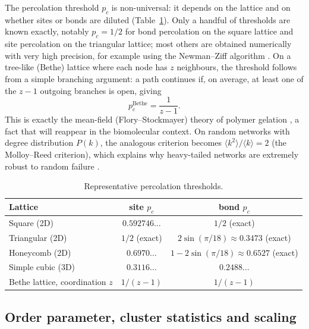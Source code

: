 \documentclass[11pt]{article}
\begin{document}
The percolation threshold $p_c$ is non-universal: it depends on the lattice and on whether sites or bonds are diluted (Table~\ref{tab:pc}). Only a handful of thresholds are known exactly, notably $p_c=1/2$ for bond percolation on the square lattice \cite{Kesten1980} and site percolation on the triangular lattice; most others are obtained numerically with very high precision, for example using the Newman--Ziff algorithm \cite{NewmanZiff2000}. On a tree-like (Bethe) lattice where each node has $z$ neighbours, the threshold follows from a simple branching argument: a path continues if, on average, at least one of the $z-1$ outgoing branches is open, giving
\begin{equation}
p_c^{\text{Bethe}}=\frac{1}{z-1}.
\label{eq:bethe}
\end{equation}
This is exactly the mean-field (Flory--Stockmayer) theory of polymer gelation \cite{Flory1941,Stockmayer1943}, a fact that will reappear in the biomolecular context. On random networks with degree distribution $P(k)$, the analogous criterion becomes $\langle k^2\rangle/\langle k\rangle=2$ (the Molloy--Reed criterion), which explains why heavy-tailed networks are extremely robust to random failure \cite{Callaway2000}.

\begin{table}[h]
\centering
\caption{Representative percolation thresholds.}
\label{tab:pc}
\begin{tabular}{lcc}
\toprule
Lattice & site $p_c$ & bond $p_c$\\
\midrule
Square (2D) & $0.592746\ldots$ & $1/2$ (exact)\\
Triangular (2D) & $1/2$ (exact) & $2\sin(\pi/18)\approx0.3473$ (exact)\\
Honeycomb (2D) & $0.6970\ldots$ & $1-2\sin(\pi/18)\approx0.6527$ (exact)\\
Simple cubic (3D) & $0.3116\ldots$ & $0.2488\ldots$\\
Bethe lattice, coordination $z$ & $1/(z-1)$ & $1/(z-1)$\\
\bottomrule
\end{tabular}
\end{table}

\subsection{Order parameter, cluster statistics and scaling}
\end{document}
